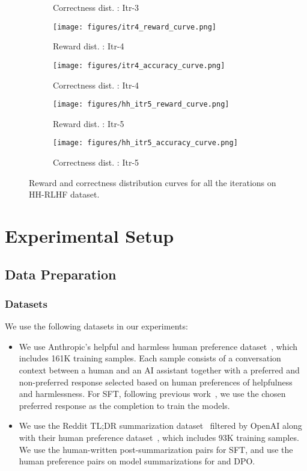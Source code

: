 \begin{figure*}[t]
\begin{subfigure}{0.23\linewidth}
\caption{Correctness dist. : Itr-3}
\label{fig:itr3_accuracy_curve}
\end{subfigure}
\begin{subfigure}{0.23\linewidth}
\centering
\texttt{[image: figures/itr4\_reward\_curve.png]}
\caption{Reward dist. : Itr-4}
\label{fig:itr4_reward_curve}
\end{subfigure}
\begin{subfigure}{0.23\linewidth}
\centering
\texttt{[image: figures/itr4\_accuracy\_curve.png]}
\caption{Correctness dist. : Itr-4}
\label{fig:itr4_accuracy_curve}
\end{subfigure}
\begin{subfigure}{0.23\linewidth}
\centering
\texttt{[image: figures/hh\_itr5\_reward\_curve.png]}
\caption{Reward dist. : Itr-5}
\label{fig:itr5_reward_curve}
\end{subfigure}
\begin{subfigure}{0.23\linewidth}
\centering
\texttt{[image: figures/hh\_itr5\_accuracy\_curve.png]}
\caption{Correctness dist. : Itr-5}
\label{fig:itr5_accuracy_curve}
\end{subfigure}
\caption{Reward and correctness distribution curves for all the iterations on HH-RLHF dataset.}
\label{fig:reward_and_accuracy_curve}
\end{figure*}


\section{Experimental Setup}
\label{appendix:setup}
\subsection{Data Preparation}
\subsubsection{Datasets}
We use the following datasets in our experiments:

\begin{itemize}[leftmargin=*]
    \item {}
    We use Anthropic's helpful and harmless human preference dataset~\cite{bai2022training}, which includes 161K training samples. Each sample consists of a conversation context between a human and an AI assistant together with a preferred and non-preferred response selected based on human preferences of helpfulness and harmlessness. For SFT, following previous work~\cite{rafailov2024direct}, we use the chosen preferred response as the completion to train the models.
    \item {}
    We use the Reddit TL;DR summarization dataset~\cite{volske2017tl} filtered by OpenAI along with their human preference dataset~\cite{stiennon2020learning}, which includes 93K training samples. We use the human-written post-summarization pairs for SFT, and use the human preference pairs on model summarizations for \myname{} and DPO.
\end{itemize}

